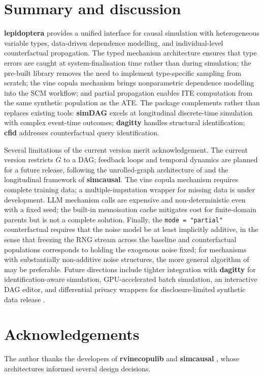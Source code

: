 \documentclass[12pt]{article}
\newcommand{\pkg}[1]{\textbf{#1}}
\newcommand{\code}[1]{\texttt{#1}}
\begin{document}
\section{Summary and discussion}
\label{sec:discussion}

\pkg{lepidoptera} provides a unified interface for causal simulation with
heterogeneous variable types, data-driven dependence modelling, and
individual-level counterfactual propagation. The typed mechanism architecture
ensures that type errors are caught at system-finalisation time rather than during
simulation; the pre-built library removes the need to implement type-specific
sampling from scratch; the vine copula mechanism brings nonparametric dependence
modelling into the SCM workflow; and partial propagation enables ITE computation
from the same synthetic population as the ATE. The package complements rather than
replaces existing tools: \pkg{simDAG} \citep{denz2026simdag} excels at
longitudinal discrete-time simulation with complex event-time outcomes;
\pkg{dagitty} \citep{textor2016dagitty} handles structural identification;
\pkg{cfid} \citep{tikka2022cfid} addresses counterfactual query identification.

Several limitations of the current version merit acknowledgement. The current
version restricts $G$ to a DAG; feedback loops and temporal dynamics are planned for
a future release, following the unrolled-graph architecture of
\citet{bongers2021foundations} and the longitudinal framework of
\pkg{simcausal}. The vine copula mechanism requires complete training data; a
multiple-imputation wrapper for missing data is under development. LLM mechanism
calls are expensive and non-deterministic even with a fixed seed; the built-in
memoisation cache mitigates cost for finite-domain parents but is not a complete
solution. Finally, the \code{mode = "partial"} counterfactual requires that the
noise model be at least implicitly additive, in the sense that freezing the RNG
stream across the baseline and counterfactual populations corresponds to holding
the exogenous noise fixed; for mechanisms with substantially non-additive noise
structures, the more general algorithm of \citet{karvanen2024simcf} may be
preferable. Future directions include tighter integration with \pkg{dagitty} for
identification-aware simulation, GPU-accelerated batch simulation, an interactive
DAG editor, and differential privacy wrappers for disclosure-limited synthetic
data release \citep{nowok2016synthpop, reiter2002satisfying}.


\section*{Acknowledgements}
The author thanks the developers of \pkg{rvinecopulib} \citep{nagler2022rvinecopulib}
and \pkg{simcausal} \citep{sofrygin2017simcausal}, whose architectures informed
several design decisions.



\end{document}
